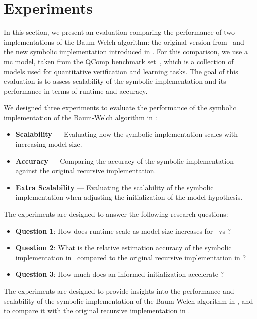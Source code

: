 \section{Experiments}\label{sec:experiments}
In this section, we present an evaluation comparing the performance of two implementations of the Baum-Welch algorithm: the original version from \Jajapy\ and the new symbolic implementation introduced in \JajapyTwo.
For this comparison, we use a \gls{mc} model, taken from the QComp benchmark set~\cite{hartmanns2019quantitative}, which is a collection of models used for quantitative verification and learning tasks.
The goal of this evaluation is to assess scalability of the symbolic implementation and its performance in terms of runtime and accuracy.

We designed three experiments to evaluate the performance of the symbolic implementation of the Baum-Welch algorithm in \JajapyTwo:
\begin{itemize}
    \item \textbf{Scalability} — Evaluating how the symbolic implementation scales with increasing model size.
    \item \textbf{Accuracy} — Comparing the accuracy of the symbolic implementation against the original recursive implementation.
    \item \textbf{Extra Scalability} — Evaluating the scalability of the symbolic implementation when adjusting the initialization of the model hypothesis.
\end{itemize}
The experiments are designed to answer the following research questions:
\begin{itemize}
    \item \textbf{Question 1}: How does runtime scale as model size increases for \JajapyTwo\ vs \Jajapy?
    \item \textbf{Question 2}: What is the relative estimation accuracy of the symbolic implementation in \JajapyTwo\ compared to the original recursive implementation in \Jajapy?
    \item \textbf{Question 3}: How much does an informed initialization accelerate \JajapyTwo?
\end{itemize}
The experiments are designed to provide insights into the performance and scalability of the symbolic implementation of the Baum-Welch algorithm in \JajapyTwo, and to compare it with the original recursive implementation in \Jajapy.

